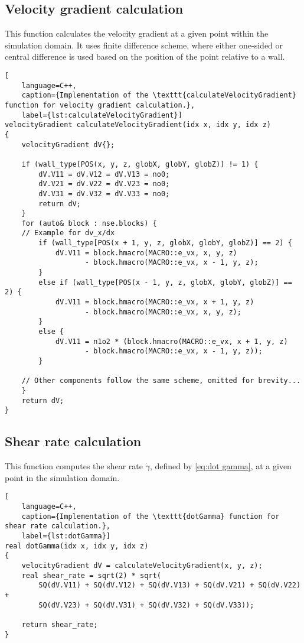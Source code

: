 \subsection*{Velocity gradient calculation}
This function calculates the velocity gradient at a given point within the simulation domain. It uses finite difference scheme, where either one-sided or central difference is used based on the position of the point relative to a wall.
\begin{lstlisting}[
	language=C++,
	caption={Implementation of the \texttt{calculateVelocityGradient} function for velocity gradient calculation.},
	label={lst:calculateVelocityGradient}]
velocityGradient calculateVelocityGradient(idx x, idx y, idx z)
{
	velocityGradient dV{};
	
	if (wall_type[POS(x, y, z, globX, globY, globZ)] != 1) {
		dV.V11 = dV.V12 = dV.V13 = no0;
		dV.V21 = dV.V22 = dV.V23 = no0;
		dV.V31 = dV.V32 = dV.V33 = no0;
		return dV;
	}
	for (auto& block : nse.blocks) {
	// Example for dv_x/dx
		if (wall_type[POS(x + 1, y, z, globX, globY, globZ)] == 2) {
			dV.V11 = block.hmacro(MACRO::e_vx, x, y, z) 
				   - block.hmacro(MACRO::e_vx, x - 1, y, z);
		}
		else if (wall_type[POS(x - 1, y, z, globX, globY, globZ)] == 2) {
			dV.V11 = block.hmacro(MACRO::e_vx, x + 1, y, z) 
				   - block.hmacro(MACRO::e_vx, x, y, z);
		}
		else {
			dV.V11 = n1o2 * (block.hmacro(MACRO::e_vx, x + 1, y, z)
				   - block.hmacro(MACRO::e_vx, x - 1, y, z));
		}
	
	// Other components follow the same scheme, omitted for brevity...
	}
	return dV;
}
\end{lstlisting}

\subsection*{Shear rate calculation}
This function computes the shear rate $\dot{\gamma}$, defined by \ref{eq:dot gamma}, at a given point in the simulation domain.
\begin{lstlisting}[
	language=C++,
	caption={Implementation of the \texttt{dotGamma} function for shear rate calculation.},
	label={lst:dotGamma}]
real dotGamma(idx x, idx y, idx z)
{
	velocityGradient dV = calculateVelocityGradient(x, y, z);
	real shear_rate = sqrt(2) * sqrt(
		SQ(dV.V11) + SQ(dV.V12) + SQ(dV.V13) + SQ(dV.V21) + SQ(dV.V22) +
	    SQ(dV.V23) + SQ(dV.V31) + SQ(dV.V32) + SQ(dV.V33));

	return shear_rate;
}
\end{lstlisting}


